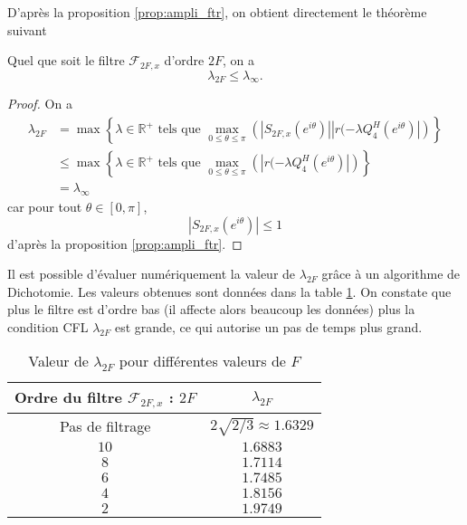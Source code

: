 D'après la proposition \ref{prop:ampli_ftr}, on obtient directement le théorème suivant
\begin{theoreme}
Quel que soit le filtre $\mathcal{F}_{2F,x}$ d'ordre $2F$, on a 
\begin{equation}
\lambda_{2F} \leq \lambda_{\infty}.
\end{equation}
\end{theoreme}

\begin{proof}
On a 
\begin{align*}
\lambda_{2F} & = \max \left\lbrace \lambda \in \mathbb{R}^+ \text{ tels que } \max_{0 \leq \theta \leq \pi} \left(|S_{2F,x}(e^{i \theta})| | r(-\lambda Q_4^H(e^{i \theta}) | \right) \right\rbrace \\
		& \leq \max \left\lbrace \lambda \in \mathbb{R}^+ \text{ tels que } \max_{0 \leq \theta \leq \pi} \left(| r(-\lambda Q_4^H(e^{i \theta}) | \right) \right\rbrace\\
		& = \lambda_{\infty}
\end{align*}
car pour tout $\theta \in [0, \pi]$, 
\begin{equation}
|S_{2F,x}(e^{i \theta})| \leq 1
\end{equation}
d'après la proposition \ref{prop:ampli_ftr}.
\end{proof}

Il est possible d'évaluer numériquement la valeur de $\lambda_{2F}$ grâce à un algorithme de Dichotomie. Les valeurs obtenues sont données dans la table \ref{tab:cfl_adv1d}. On constate que plus le filtre est d'ordre bas (il affecte alors beaucoup les données) plus la condition CFL $\lambda_{2F}$ est grande, ce qui autorise un pas de temps plus grand.

\begin{table}[htbp]
\begin{center}
\begin{tabular}{|c|c|}
\hline
\textbf{Ordre du filtre} $\mathcal{F}_{2F,x}$ : $2F$ & $\lambda_{2F}$ \\
\hline
\hline
Pas de filtrage & $2 \sqrt{2/3} \approx 1.6329$ \\
$10$ & $1.6883$ \\
$ 8$ & $1.7114$ \\
$ 6$ & $1.7485$ \\
$ 4$ & $1.8156$ \\
$ 2$ & $1.9749$ \\
\hline
\end{tabular}
\end{center}
\caption{Valeur de $\lambda_{2F}$ pour différentes valeurs de $F$}
\label{tab:cfl_adv1d}
\end{table}














